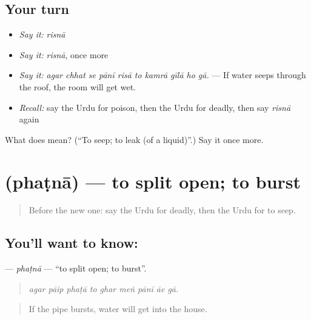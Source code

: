 \subsection*{Your turn}
\begin{itemize}
\raggedright
  \item \emph{Say it:} \emph{risnā}
  \item \emph{Say it:} \emph{risnā}, once more
  \item \emph{Say it:} \emph{agar chhat se pānī risā to kamrā gīlā ho gā.} — If water seeps through the roof, the room will get wet.
  \item \emph{Recall:} say the Urdu for poison, then the Urdu for deadly, then say \emph{risnā} again
\end{itemize}

\begin{tcolorbox}[breakable,colback=teal!4,colframe=teal!35!black,title={Before you move on}]
What does  mean? (\textquotedblleft{}To seep; to leak (of a liquid)\textquotedblright{}.) Say it once more.
\end{tcolorbox}
\section[\texorpdfstring{\ur{پھٹنا} (phaṭnā)}{پھٹنا (phaṭnā)}]{ (phaṭnā) — to split open; to burst}

\label{lesson:UR-C371-phatna}



\begin{quote}
Before the new one: say the Urdu for deadly, then the Urdu for to seep.
\end{quote}

\subsection*{You'll want to know: }
\textbf{} — \emph{phaṭnā} — \textquotedblleft{}to split open; to burst\textquotedblright{}.

\begin{quote}
        
\end{quote}

\begin{quote}
\emph{agar pāip phaṭā to ghar meṅ pānī āe gā.}
\end{quote}

\begin{quote}
If the pipe bursts, water will get into the house.
\end{quote}

